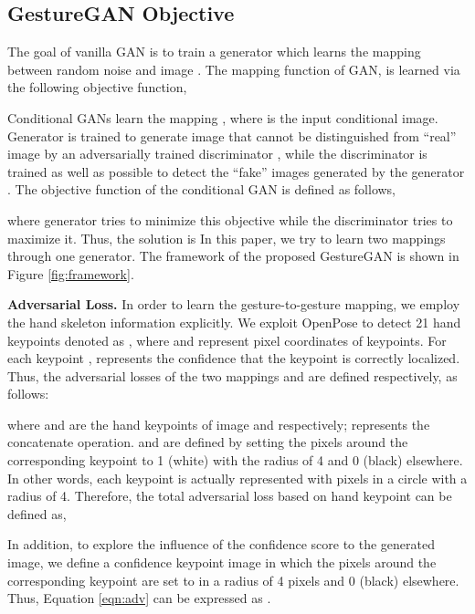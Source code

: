 \documentclass[sigconf]{acmart}
\begin{document}
\subsection{GestureGAN Objective}

The goal of vanilla GAN is to train a generator  which learns the mapping between random noise  and image .
The mapping function of GAN,  is learned via the following objective function,

Conditional GANs learn the mapping , where   is the input conditional image.
Generator  is trained to generate image  that cannot be distinguished from ``real'' image  by an adversarially trained discriminator , while the discriminator  is trained as well as possible to detect the ``fake'' images generated by the generator .  
The objective function of the conditional GAN is defined as follows,

where generator  tries to minimize this objective while the discriminator  tries to maximize it. 
Thus, the solution is 
In this paper, we try to learn two mappings through one generator.
The framework of the proposed GestureGAN is shown in Figure \ref{fig:framework}.

\noindent \textbf{Adversarial Loss.} In order to learn the  gesture-to-gesture mapping, we employ the hand skeleton information explicitly.
We exploit OpenPose \cite{simon2017hand} to detect 21 hand keypoints denoted as , where  and  represent pixel coordinates of keypoints.
For each keypoint ,  represents the confidence that the keypoint is correctly localized.
Thus, the adversarial losses of the two mappings   and  are defined respectively, as follows:



where  and  are the hand keypoints of image  and  respectively; 
 represents the concatenate operation.  and  are defined by setting the pixels around the corresponding keypoint  to 1 (white) with the radius of 4 and 0 (black) elsewhere.
In other words, each keypoint is actually represented with pixels in a circle with a radius of 4. 
Therefore, the total adversarial loss based on hand keypoint can be defined as,


In addition, to explore the influence of the confidence score  to the generated image, we define a confidence keypoint image  in which the pixels around the corresponding keypoint  are set to  in a radius of 4 pixels and 0 (black) elsewhere.
Thus, Equation \ref{eqn:adv} can be expressed as .
\end{document}
